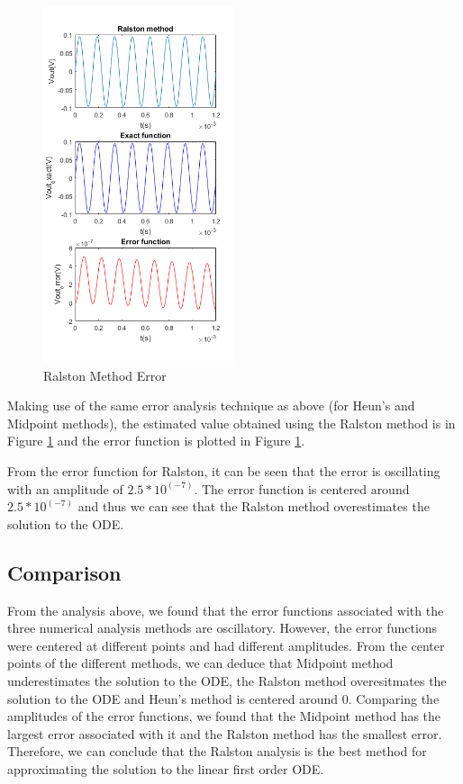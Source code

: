 \documentclass[11pt,a4paper]{article}
\begin{document}
\begin{figure}
	\vspace{-10mm}
	\includegraphics[width=0.5\textwidth]{Ex2_Figs/error_ralston.png}
	\vspace{-6mm}
	\caption{Ralston Method Error}
	\label{fig:Ralston_Error}
\end{figure}

Making use of the same error analysis technique as above (for Heun's and Midpoint methods), the estimated value obtained using the Ralston method is in Figure \ref{fig:Ralston_Error} and the error function is plotted in Figure \ref{fig:Ralston_Error}.

From the error function for Ralston, it can be seen that the error is oscillating with an amplitude of $2.5*10^(-7)$. The error function is centered around $2.5*10^(-7)$ and thus we can see that the Ralston method overestimates the solution to the ODE.

\subsection{Comparison}
From the analysis above, we found that the error functions associated with the three numerical analysis methods are oscillatory. However, the error functions were centered at different points and had different amplitudes. From the center points of the different methods, we can deduce that Midpoint method underestimates the solution to the ODE, the Ralston method overesitmates the solution to the ODE and Heun's method is centered around 0. Comparing the amplitudes of the error functions, we found that the Midpoint method has the largest error associated with it and the Ralston method has the smallest error. Therefore, we can conclude that the Ralston analysis is the best method for approximating the solution to the linear first order ODE.
\end{document}
